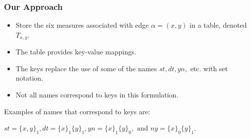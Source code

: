 \documentclass{beamer}
\begin{document}
%
%
%
\begin{frame}
\frametitle{Our Approach}
\begin{itemize}
\item  Store the six measures associated with edge $\alpha=(x,y)$ in a table, denoted $T_{x,y}$.
\item  The table provides key-value mappings. 
\item The keys replace the use of some of the names $st,dt,yn, $ etc. with set notation.
\item Not all names correspond to keys in this formulation.
\end{itemize}
 
Examples of names that correspond to keys are:

$st=\{x,y\}_1,dt=\{x\}_1\{y\}_1, yn=\{x\}_1\{y\}_0, \mbox{ and } ny=\{x\}_0\{y\}_1$.

\end{frame}
\end{document}
